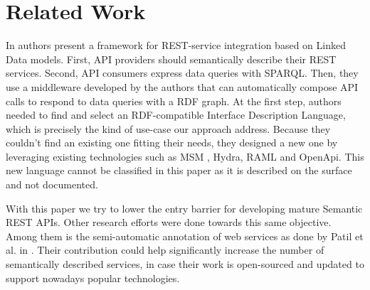 \section{Related Work}




In \cite{serrano2017linked} authors present a framework for REST-service integration based on Linked Data models. First, API providers should semantically describe their REST services. Second, API consumers express data queries with SPARQL. Then, they use a middleware developed by the authors that can automatically compose API calls to respond to data queries with a RDF graph.
At the first step, authors needed to find and select an RDF-compatible Interface Description Language, which is precisely the kind of use-case our approach address. Because they couldn't find an existing one fitting their needs, they designed a new one by leveraging existing technologies such as MSM \cite{pedrinaci2010toward}, Hydra, RAML and OpenApi. This new language cannot be classified in this paper as it is described on the surface and not documented.

With this paper we try to lower the entry barrier for developing mature Semantic REST APIs. Other research efforts were done towards this same objective. Among them is the semi-automatic annotation of web services as done by Patil et al. in \cite{patil2004meteor}. Their contribution could help significantly increase the number of semantically described services, in case their work is open-sourced and updated to support nowadays popular technologies.

